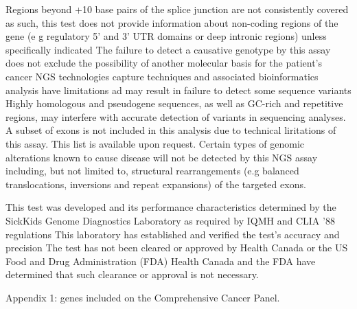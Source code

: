 \documentclass[8pt,letterpaper]{extarticle}
\newcommand{\data}[1]{}
\begin{document}
{Regions beyond +10 base pairs of the splice junction are not consistently covered as such, this test does not provide information about non-coding regions of the gene (e g regulatory 5' and 3' UTR domains or deep intronic regions) unless specifically indicated The failure to detect a causative genotype by this assay does not exclude the possibility of another molecular basis for the patient's cancer NGS technologies capture techniques and associated bioinformatics analysis have limitations ad may result in failure to detect some sequence variants  Highly homologous and pseudogene sequences, as well as GC-rich and repetitive regions, may interfere with accurate detection of variants in sequencing analyses. A subset of exons is not included in this analysis due to technical liritations of this assay. This list is available upon request.   Certain types of genomic alterations known to cause disease will not be detected by this NGS assay including, but not limited to, structural rearrangements (e.g balanced translocations, inversions and repeat expansions) of the targeted exons.

This test was developed and its performance characteristics determined by the SickKids Genome Diagnostics Laboratory as required by IQMH and CLIA '88 regulations This laboratory has established and verified the test's accuracy and precision The test has not been cleared or approved by Health Canada or the US Food and Drug Administration (FDA) Health Canada and the FDA have determined that such clearance or approval is not necessary.
}

Appendix 1: \data{num_tested_genes} genes included on the Comprehensive Cancer Panel. 
\end{document}
